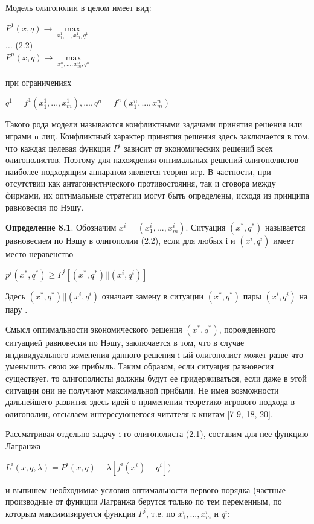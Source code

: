 \documentclass[12pt, 4paper]{book}
\begin{document}
{Модель олигополии в целом имеет вид:
\begin{center}
$P^1(x,q) \rightarrow \max\limits_{x_{1}^1,...,x_{m}^1,q^1}$ \\
$ \ldots$  (2.2)\\
$P^n(x,q) \rightarrow \max\limits_{x_{1}^n,...,x_{m}^n,q^n}$
\end{center}
\begin{center}
при ограничениях
\end{center}
\begin{center}
$q^1 = f^1(x_{1}^{1},...,x_{m}^{1}),...,q^{n} = f^n(x_{1}^n,...,x_{m}^n)$
\end{center}
\par

Такого рода модели называются конфликтными задачами принятия решения или играми n лиц. Конфликтный характер принятия решения здесь заключается в том, что каждая целевая функция $P^i$ зависит от экономических решений всех олигополистов. Поэтому для нахождения оптимальных решений олигополистов наиболее подходящим аппаратом является теория игр. В частности, при отсутствии как антагонистического противостояния, так и сговора между фирмами, их оптимальные стратегии могут быть определены, исходя из принципа равновесия по Нэшу.
\par

\textbf{Определение 8.1}. Обозначим $x^i = (x_{1}^i,...,x_{m}^i)$. Ситуация $(x^{*},q^{*})$ называется равновесием по Нэшу в олигополии (2.2), если для любых i и $(x^i,q^i)$ имеет место неравенство 
\begin{center}
$p^i(x^{*},q^{*}) \geq P^i [(x^{*},q^{*}) ||(x^i,q^i)]$
\end{center}
Здесь $(x^{*},q^{*}) ||(x^i,q^i)$ означает замену в ситуации $(x^{*},q^{*})$ пары $(x^i,q^i)$ на пару .
\par

Смысл оптимальности экономического решения $(x^{*},q^{*})$, порожденного ситуацией равновесия по Нэшу, заключается в том, что в случае индивидуального изменения данного решения i-ый олигополист может разве что уменьшить свою же прибыль. Таким образом, если ситуация равновесия существует, то олигополисты должны будут ее придерживаться, если даже в этой ситуации они не получают максимальной прибыли. Не имея возможности дальнейшего развития здесь идей о применении теоретико-игрового подхода в олигополии, отсылаем интересующегося читателя к книгам [7-9, 18, 20].
\par

Рассматривая отдельно задачу i-го олигополиста (2.1), составим для нее функцию Лагранжа
\begin{center}
$L^i(x,q,\lambda)=P^i(x,q)+ \lambda [f^i(x^i)- q^i])$
\end{center}
и выпишем необходимые условия оптимальности первого порядка (частные производные от функции Лагранжа берутся только по тем переменным, по которым максимизируется функция $P^i$, т.е. по $x_{1}^i,...,x_{m}^i$ и $q^i$:
\par

}
\end{document}
